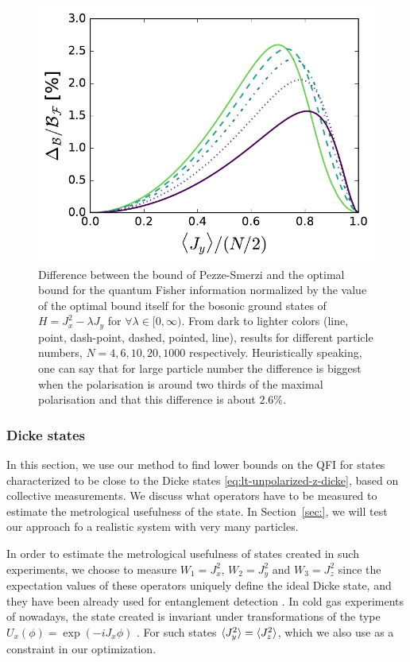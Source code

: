 \begin{figure}
  \centering
  \includegraphics[scale=.65]{img/plots/LT_edge_diff.pdf}
  \caption[Boundary difference of optimal bound versus Pezz\'e-Smerzi bound.]{Difference between the bound of Pezze-Smerzi and the optimal bound for the quantum Fisher information normalized by the value of the optimal bound itself for the bosonic ground states of $H=J_x^2-\lambda J_y$ for $\forall \lambda \in [0,\infty)$.
  From dark to lighter colors (line, point, dash-point, dashed, pointed, line), results for different particle numbers, $N=4,6,10,20,1000$ respectively.
  Heuristically speaking, one can say that for large particle number the difference is biggest when the polarisation is around two thirds of the maximal polarisation and that this difference is about $2.6\%$.}
  \label{fig:lt-edge-diff}
\end{figure}

\subsubsection{Dicke states}
\label{sec:lt-dicke-states}
In this section, we use our method to find lower bounds on the QFI for states characterized to be close to the Dicke states \eqref{eq:lt-unpolarized-z-dicke}, based on collective measurements.
We discuss what operators have to be measured to estimate the metrological usefulness of the state.
In Section~\ref{sec:}, we will test our approach fo a realistic system with very many particles.

In order to estimate the metrological usefulness of states created in such experiments, we choose to measure $W_1=J_x^2$, $W_2=J_y^2$ and $W_3=J_z^2$ since the expectation values of these operators uniquely define the ideal Dicke state, and they have been already used for entanglement detection \citep{Lucke2014}.
In cold gas experiments of nowadays, the state created is invariant under transformations of the type $U_{x}(\phi)=\exp(-i J_x \phi)$ \citep{Apellaniz2015}.
For such states $\langle J_y^2 \rangle=\langle J_z^2 \rangle$, which we also use as a constraint in our optimization.

